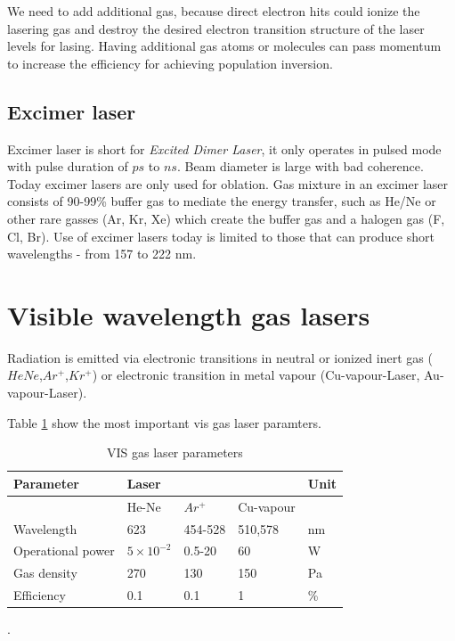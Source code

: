 We need to add additional gas, because direct electron hits could ionize the lasering gas and destroy the desired electron transition structure 
of the laser levels for lasing. Having additional gas atoms or molecules can pass momentum to increase the efficiency for achieving population inversion.

\subsection{Excimer laser}
Excimer laser is short for \textit{Excited Dimer Laser}, it only operates in pulsed mode with pulse duration of $ps$ to $ns$.
Beam diameter is large with bad coherence. Today excimer lasers are only used for oblation.
Gas mixture in an excimer laser consists of 90-99\% buffer gas to mediate the energy transfer, such as He/Ne or other rare gasses (Ar, Kr, Xe) which create the buffer gas and a halogen gas (F, Cl, Br).
Use of excimer lasers today is limited to those that can produce short wavelengths - from 157 to 222 nm.


\section{Visible wavelength gas lasers}
Radiation is emitted via electronic transitions in neutral or ionized inert gas ($HeNe$,$Ar^+$,$Kr^+$) or electronic transition
in metal vapour (Cu-vapour-Laser, Au-vapour-Laser).


Table \ref{tab:visgasl} show the most important vis gas laser paramters.
\begin{table}[h!]
    \centering
    \begin{tabular}{|l|l|l|l|l|}
    \hline
    Parameter         & \multicolumn{3}{l}{Laser}                & Unit \\
    \hline
                      & He-Ne              & $Ar^+$  & Cu-vapour &      \\
    \hline
    Wavelength         & 623                & 454-528 & 510,578   & nm   \\
    Operational power & $5 \times 10^{-2}$ & 0.5-20  & 60        & W    \\
    Gas density       & 270                & 130     & 150       & Pa   \\
    Efficiency        & 0.1                & 0.1     & 1         & \%  \\
    \hline
    \end{tabular}
    \caption{VIS gas laser parameters}.
    \label{tab:visgasl}
\end{table}

